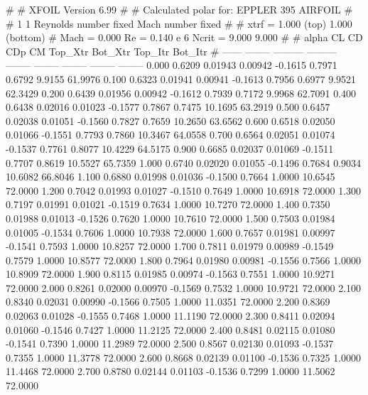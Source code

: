 #  
#       XFOIL         Version 6.99
#  
# Calculated polar for: EPPLER 395 AIRFOIL                              
#  
# 1 1 Reynolds number fixed          Mach number fixed         
#  
# xtrf =   1.000 (top)        1.000 (bottom)  
# Mach =   0.000     Re =     0.140 e 6     Ncrit =   9.000  9.000
#  
#   alpha    CL        CD       CDp       CM     Top_Xtr  Bot_Xtr  Top_Itr  Bot_Itr
#  ------ -------- --------- --------- -------- -------- -------- -------- --------
   0.000   0.6209   0.01943   0.00942  -0.1615   0.7971   0.6792   9.9155  61.9976
   0.100   0.6323   0.01941   0.00941  -0.1613   0.7956   0.6977   9.9521  62.3429
   0.200   0.6439   0.01956   0.00942  -0.1612   0.7939   0.7172   9.9968  62.7091
   0.400   0.6438   0.02016   0.01023  -0.1577   0.7867   0.7475  10.1695  63.2919
   0.500   0.6457   0.02038   0.01051  -0.1560   0.7827   0.7659  10.2650  63.6562
   0.600   0.6518   0.02050   0.01066  -0.1551   0.7793   0.7860  10.3467  64.0558
   0.700   0.6564   0.02051   0.01074  -0.1537   0.7761   0.8077  10.4229  64.5175
   0.900   0.6685   0.02037   0.01069  -0.1511   0.7707   0.8619  10.5527  65.7359
   1.000   0.6740   0.02020   0.01055  -0.1496   0.7684   0.9034  10.6082  66.8046
   1.100   0.6880   0.01998   0.01036  -0.1500   0.7664   1.0000  10.6545  72.0000
   1.200   0.7042   0.01993   0.01027  -0.1510   0.7649   1.0000  10.6918  72.0000
   1.300   0.7197   0.01991   0.01021  -0.1519   0.7634   1.0000  10.7270  72.0000
   1.400   0.7350   0.01988   0.01013  -0.1526   0.7620   1.0000  10.7610  72.0000
   1.500   0.7503   0.01984   0.01005  -0.1534   0.7606   1.0000  10.7938  72.0000
   1.600   0.7657   0.01981   0.00997  -0.1541   0.7593   1.0000  10.8257  72.0000
   1.700   0.7811   0.01979   0.00989  -0.1549   0.7579   1.0000  10.8577  72.0000
   1.800   0.7964   0.01980   0.00981  -0.1556   0.7566   1.0000  10.8909  72.0000
   1.900   0.8115   0.01985   0.00974  -0.1563   0.7551   1.0000  10.9271  72.0000
   2.000   0.8261   0.02000   0.00970  -0.1569   0.7532   1.0000  10.9721  72.0000
   2.100   0.8340   0.02031   0.00990  -0.1566   0.7505   1.0000  11.0351  72.0000
   2.200   0.8369   0.02063   0.01028  -0.1555   0.7468   1.0000  11.1190  72.0000
   2.300   0.8411   0.02094   0.01060  -0.1546   0.7427   1.0000  11.2125  72.0000
   2.400   0.8481   0.02115   0.01080  -0.1541   0.7390   1.0000  11.2989  72.0000
   2.500   0.8567   0.02130   0.01093  -0.1537   0.7355   1.0000  11.3778  72.0000
   2.600   0.8668   0.02139   0.01100  -0.1536   0.7325   1.0000  11.4468  72.0000
   2.700   0.8780   0.02144   0.01103  -0.1536   0.7299   1.0000  11.5062  72.0000
